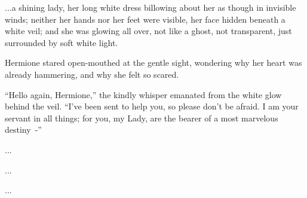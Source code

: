 ...a shining lady, her long white dress billowing about her as though in invisible winds; neither her hands nor her feet were visible, her face hidden beneath a white veil; and she was glowing all over, not like a ghost, not transparent, just surrounded by soft white light.

Hermione stared open-mouthed at the gentle sight, wondering why her heart was already hammering, and why she felt so scared.

``Hello again, Hermione,'' the kindly whisper emanated from the white glow behind the veil. ``I've been sent to help you, so please don't be afraid. I am your servant in all things; for you, my Lady, are the bearer of a most marvelous destiny~-''

...

...

...
